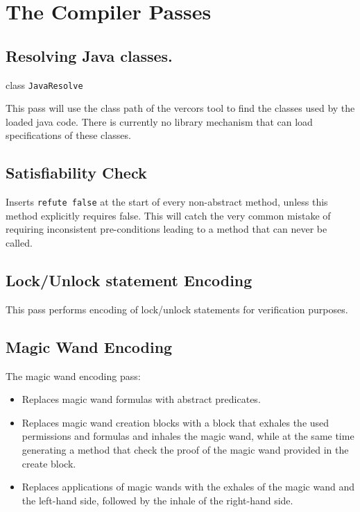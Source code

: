 \chapter{The Compiler Passes}

\section{Resolving Java classes.}

class \lstinline+JavaResolve+

This pass will use the class path of the vercors tool
to find the classes used by the loaded java code.
There is currently no library mechanism that can load
specifications of these classes.


\section{Satisfiability Check}

Inserts \lstinline+refute false+ at the start of every non-abstract
method, unless this method explicitly requires false.
This will catch the very common mistake of requiring
inconsistent pre-conditions leading to a method that
can never be called.

\section{Lock/Unlock statement Encoding}

This pass performs encoding of lock/unlock statements for verification
purposes.

\section{Magic Wand Encoding}

The magic wand encoding pass:
\begin{itemize}
\item Replaces magic wand formulas with abstract predicates.
\item Replaces magic wand creation blocks with a block that exhales the 
used permissions and formulas and inhales the magic wand,
while at the same time generating a method that check the proof
of the magic wand provided in the create block.
\item Replaces applications of magic wands with the exhales of the 
magic wand and the left-hand side, followed by the inhale of the right-hand side.
\end{itemize}


